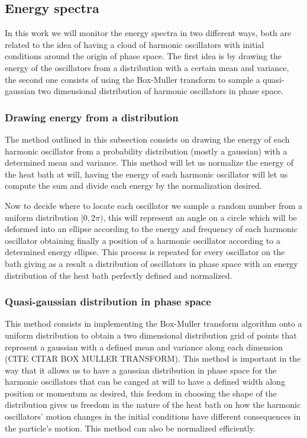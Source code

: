 \subsection{Energy spectra}
In this work we will monitor the energy spectra in two different ways, both are related to the idea of having a cloud of harmonic oscillators with initial conditions around the origin of phase space. The first idea is by  drawing the energy of the oscillators from a distribution with a certain mean and variance, the second one consists of using the Box-Muller transform to sample a quasi-gaussian two dimensional distribution of harmonic oscillators in phase space. 
\subsubsection{Drawing energy from a distribution}
The method outlined in this subsection consists on drawing the energy of each harmonic oscillator from a probability distribution (mostly a gaussian) with a determined mean and variance. This method will let us normalize the energy of the heat bath at will, having the energy of each harmonic oscillator will let us compute the sum and divide each energy by the normalization desired.\par 
Now to decide where to locate each oscillator we sample a random number from a uniform distribution $[0,2\pi)$, this will represent an angle on a circle which will be deformed into an ellipse according to the energy and frequency of each harmonic oscillator obtaining finally a position of a harmonic oscillator according to a determined energy ellipse. This process is repeated for every oscillator on the bath giving as a result a distribution of oscillators in phase space with an energy distribution of the heat bath perfectly defined and normalized.

\subsubsection{Quasi-gaussian distribution in phase space}
This method consists in implementing the Box-Muller transform algorithm onto a uniform distribution to obtain a two dimensional distribution grid of points that represent a gaussian with a defined mean and variance along each dimension (CITE CITAR BOX MULLER TRANSFORM). This method is important in the way that it allows us to have a gaussian distribution in phase space for the harmonic oscillators that can be canged at will to have a defined width along position or momentum as desired, this feedom in choosing the shape of the distribution gives us freedom in the nature of the heat bath on how the harmonic oscillators' motion changes in the initial conditions have different consequences in the particle's motion. This method can also be normalized efficiently.





